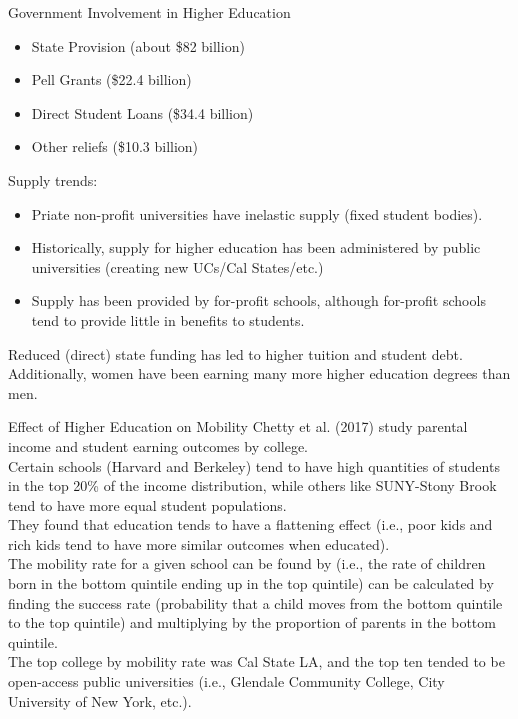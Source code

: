 \documentclass[8pt]{extarticle}
\begin{document}
  \begin{problem}{Government Involvement in Higher Education}
    \begin{itemize}
      \item State Provision (about \$82 billion)
      \item Pell Grants (\$22.4 billion)
      \item Direct Student Loans (\$34.4 billion)
      \item Other reliefs (\$10.3 billion)
    \end{itemize}
    Supply trends:
    \begin{itemize}
      \item Priate non-profit universities have inelastic supply (fixed student bodies).
      \item Historically, supply for higher education has been administered by public universities (creating new UCs/Cal States/etc.)
      \item Supply has been provided by for-profit schools, although for-profit schools tend to provide little in benefits to students.
    \end{itemize}
    Reduced (direct) state funding has led to higher tuition and student debt.\\

    Additionally, women have been earning many more higher education degrees than men.\\
    \begin{problem}{Effect of Higher Education on Mobility}
      Chetty et al. (2017) study parental income and student earning outcomes by college.\\

      Certain schools (Harvard and Berkeley) tend to have high quantities of students in the top 20\% of the income distribution, while others like SUNY-Stony Brook tend to have more equal student populations.\\

      They found that education tends to have a flattening effect (i.e., poor kids and rich kids tend to have more similar outcomes when educated).\\

      The mobility rate for a given school can be found by (i.e., the rate of children born in the bottom quintile ending up in the top quintile) can be calculated by finding the success rate (probability that a child moves from the bottom quintile to the top quintile) and multiplying by the proportion of parents in the bottom quintile.\\

      The top college by mobility rate was Cal State LA, and the top ten tended to be open-access public universities (i.e., Glendale Community College, City University of New York, etc.).
    \end{problem}
  \end{problem}
\end{document}
